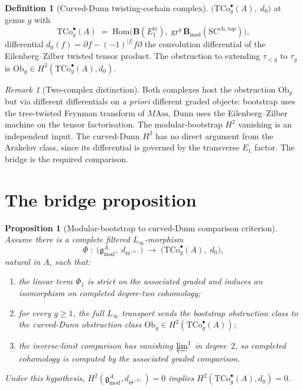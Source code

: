 \documentclass[11pt]{amsart}
\newtheorem{proposition}[theorem]{Proposition}
\theoremstyle{definition}
\newtheorem{definition}[theorem]{Definition}
\theoremstyle{remark}
\newtheorem{remark}[theorem]{Remark}
\providecommand{\Bmod}{\mathbf{B}_{\mathrm{mod}}}
\begin{document}
\begin{definition}[Curved-Dunn twisting-cochain complex]%
\label{def:curved-dunn-complex-standalone}%
$\bigl(\mathrm{TCo}^\bullet_g(A),\; d_0\bigr)$ at genus $g$ with
\[
  \mathrm{TCo}^\bullet_g(A)
  \;=\; \mathrm{Hom}\!\bigl(
     \mathbf{B}(E_1^{\mathrm{tr}}),\;
     \mathrm{gr}^g\,\Bmod(\mathrm{SC}^{\mathrm{ch,top}})\bigr),
\]
differential $d_0(f) = \partial f - (-1)^{|f|} f \partial$ the
convolution differential of the Eilenberg--Zilber twisted tensor
product. The obstruction to extending
$\tau_{<g}$ to $\tau_g$ is
$\mathrm{Ob}_g \in H^2(\mathrm{TCo}^\bullet_g(A), d_0)$.
\end{definition}

\begin{remark}[Two-complex distinction]%
\label{rem:fm67-two-complex}%
Both complexes host the obstruction $\mathrm{Ob}_g$ but via different
differentials on \emph{a priori} different graded objects:
bootstrap uses the tree-twisted Feynman transform of
$M\mathrm{Ass}$, Dunn uses the Eilenberg--Zilber machine on the
tensor factorisation. The modular-bootstrap $H^2$ vanishing is an
independent input.  The curved-Dunn $H^2$ has no direct argument from
the Arakelov class, since its differential is governed by the
transverse $E_1$ factor. The bridge is the required comparison.
\end{remark}

\section{The bridge proposition}
\label{sec:bridge-cd-standalone}

\begin{proposition}[Modular-bootstrap to curved-Dunn comparison criterion]%
\label{prop:modular-bootstrap-to-curved-dunn-bridge-standalone}%
Assume there is a complete filtered \(L_\infty\)-morphism
\[
  \Phi \;:\;
  \bigl(\mathfrak{g}^A_{\mathrm{mod}},\; d_{\Theta^{(0)}}\bigr)
  \;\longrightarrow\;
  \bigl(\mathrm{TCo}^\bullet_g(A),\; d_0\bigr),
\]
natural in $A$, such that:
\begin{enumerate}[label=\textup{(\roman*)}]
\item the linear term \(\Phi_1\) is strict on the associated graded
  and induces an isomorphism on completed degree-two cohomology;
\item for every $g \ge 1$, the full \(L_\infty\) transport sends the
  bootstrap obstruction class to the curved-Dunn obstruction class
  \(\mathrm{Ob}_g \in H^2(\mathrm{TCo}^\bullet_g(A))\);
\item the inverse-limit comparison has vanishing \(\varprojlim^1\) in
  degree~$2$, so completed cohomology is computed by the associated
  graded comparison.
\end{enumerate}
Under this hypothesis,
$H^2(\mathfrak{g}^A_{\mathrm{mod}}, d_{\Theta^{(0)}}) = 0$ implies
$H^2(\mathrm{TCo}^\bullet_g(A), d_0) = 0$.
\end{proposition}
\end{document}
